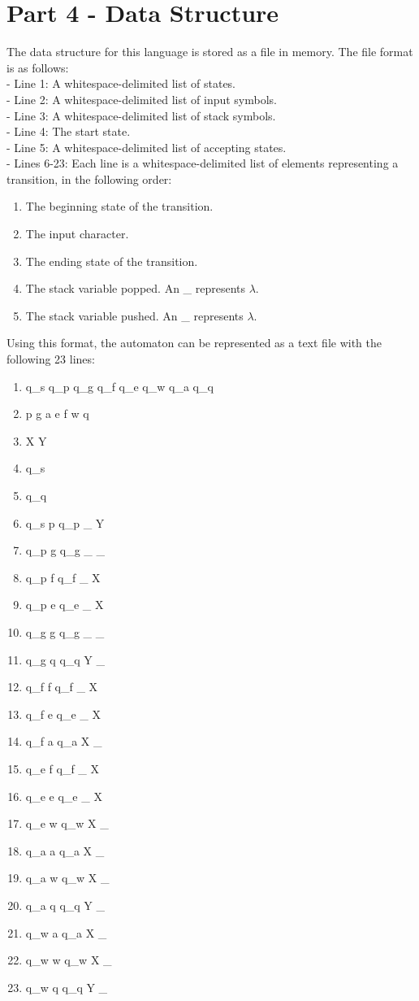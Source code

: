 \documentclass{article}
\begin{document}
\section{Part 4 - Data Structure}
The data structure for this language is stored as a file in memory. The file format is as follows:\\
- Line 1: A whitespace-delimited list of states.\\
- Line 2: A whitespace-delimited list of input symbols. \\
- Line 3: A whitespace-delimited list of stack symbols. \\
- Line 4: The start state. \\
- Line 5: A whitespace-delimited list of accepting states. \\
- Lines 6-23: Each line is a whitespace-delimited list of elements representing a transition, in the following order:
\begin{enumerate}
    \item The beginning state of the transition.
    \item The input character.
    \item The ending state of the transition.
    \item The stack variable popped. An \_ represents $\lambda$.
    \item The stack variable pushed. An \_ represents $\lambda$. 
\end{enumerate}
Using this format, the automaton can be represented as a text file with the following 23 lines:
\begin{enumerate}
    \item q\_s q\_p q\_g q\_f q\_e q\_w q\_a q\_q
    \item p g a e f w q
    \item X Y
    \item q\_s
    \item q\_q
    \item q\_s p q\_p \_ Y
    \item q\_p g q\_g \_ \_
    \item q\_p f q\_f \_ X
    \item q\_p e q\_e \_ X
    \item q\_g g q\_g \_ \_
    \item q\_g q q\_q Y \_
    \item q\_f f q\_f \_ X
    \item q\_f e q\_e \_ X
    \item q\_f a q\_a X \_
    \item q\_e f q\_f \_ X
    \item q\_e e q\_e \_ X
    \item q\_e w q\_w X \_
    \item q\_a a q\_a X \_
    \item q\_a w q\_w X \_
    \item q\_a q q\_q Y \_
    \item q\_w a q\_a X \_
    \item q\_w w q\_w X \_
    \item q\_w q q\_q Y \_
\end{enumerate}
\end{document}
